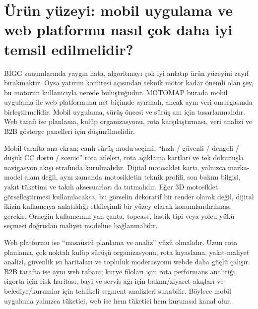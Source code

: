 \documentclass[11pt,a4paper]{article}
\begin{document}
\section{Ürün yüzeyi: mobil uygulama ve web platformu nasıl çok daha iyi temsil edilmelidir?}

BİGG sunumlarında yaygın hata, algoritmayı çok iyi anlatıp ürün yüzeyini zayıf bırakmaktır. Oysa yatırım komitesi açısından teknik motor kadar önemli olan şey, bu motorun kullanıcıyla nerede buluştuğudur. MOTOMAP burada mobil uygulama ile web platformunu net biçimde ayırmalı, ancak aynı veri omurgasında birleştirmelidir. Mobil uygulama, sürüş öncesi ve sürüş anı için tasarlanmalıdır. Web tarafı ise planlama, kulüp organizasyonu, rota karşılaştırması, veri analizi ve B2B gösterge panelleri için düşünülmelidir.

Mobil tarafta ana ekran; canlı sürüş modu seçimi, ``hızlı / güvenli / dengeli / düşük CC dostu / scenic'' rota aileleri, rota açıklama kartları ve tek dokunuşla navigasyon akışı etrafında kurulmalıdır. Dijital motosiklet kartı, yalnızca marka-model alanı değil, aynı zamanda motosikletin teknik profili, son bakım bilgisi, yakıt tüketimi ve takılı aksesuarları da tutmalıdır. Eğer 3D motosiklet görselleştirmesi kullanılacaksa, bu görselin dekoratif bir render olarak değil, dijital ikizin kullanıcıya anlatıldığı etkileşimli bir yüzey olarak konumlandırılması gerekir. Örneğin kullanıcının yan çanta, topcase, lastik tipi veya yolcu yükü seçmesi doğrudan maliyet modeline bağlanmalıdır.

Web platformu ise ``masaüstü planlama ve analiz'' yüzü olmalıdır. Uzun rota planlama, çok noktalı kulüp sürüşü organizasyonu, rota kıyaslama, yakıt-maliyet analizi, güvenlik ısı haritaları ve topluluk moderasyonu webde daha güçlü çalışır. B2B tarafta ise aynı web tabanı; kurye filoları için rota performans analitiği, sigorta için risk haritası, bayi ve servis ağı için bakım/ziyaret akışları ve belediye/kurumlar için tehlikeli segment analizleri sunabilir. Böylece mobil uygulama yalnızca tüketici, web ise hem tüketici hem kurumsal kanal olur.
\end{document}
